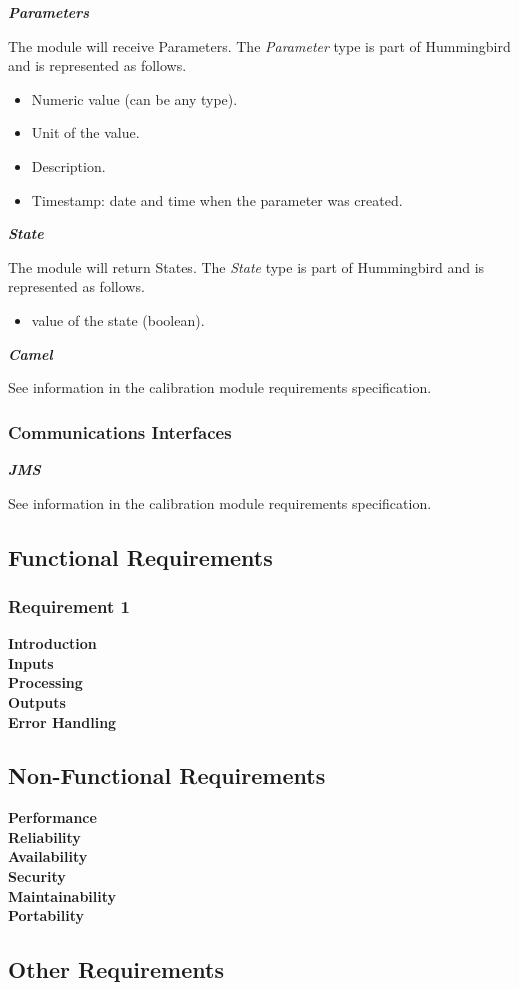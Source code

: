 \textbf{\emph{Parameters}}

The module will receive Parameters. The \emph{Parameter} type is part of Hummingbird and is represented as follows.

\begin{itemize}
\item Numeric value (can be any type).
\item Unit of the value.
\item Description.
\item Timestamp: date and time when the parameter was created.

\end{itemize}


\textbf{\emph{State}}

The module will return States. The \emph{State} type is part of Hummingbird and is represented as follows.

\begin{itemize}
\item value of the state (boolean).

\end{itemize}

\textbf{\emph{Camel}}

See information in the calibration module requirements specification.


\subsubsection{Communications Interfaces}

\textbf{\emph{JMS}}

See information in the calibration module requirements specification.


\subsection{Functional Requirements}

\subsubsection{Requirement 1}

\textbf{Introduction}\\
\textbf{Inputs}\\
\textbf{Processing}\\
\textbf{Outputs}\\
\textbf{Error Handling}\\

\subsection{Non-Functional Requirements}

\textbf{Performance}\\
\textbf{Reliability}\\
\textbf{Availability}\\
\textbf{Security}\\
\textbf{Maintainability}\\
\textbf{Portability}\\

\subsection{Other Requirements}

\newpage


